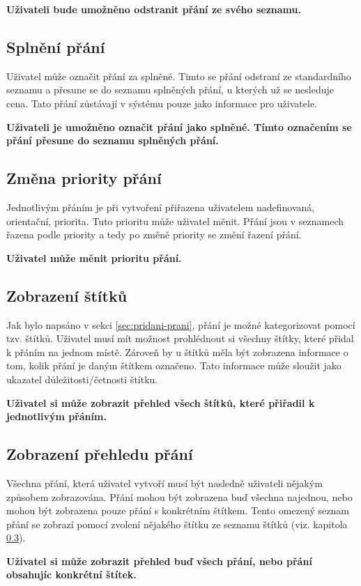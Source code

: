 \textbf{Uživateli bude umožněno odstranit přání ze svého seznamu.}

\subsection{Splnění přání}
Uživatel může označit přání za splněné. Timto se přání odstraní ze standardního seznamu a přesune se do seznamu splněných přání, u kterých už se nesleduje cena. Tato přání zůstávají v sýstému pouze jako informace pro uživatele.

\textbf{Uživateli je umožněno označit přání jako splněné. Tímto označením se přání přesune do seznamu splněných přání.}

\subsection{Změna priority přání}
Jednotlivým přáním je při vytvoření přiřazena uživatelem nadefinovaná, orientační, priorita. Tuto prioritu může uživatel měnit. Přání jsou v seznamech řazena podle priority a tedy po změně priority se změní řazení přání.

\textbf{Uživatel může měnit prioritu přání.}

\subsection{Zobrazení štítků}
\label{sec:zobrazeni-stitku}
Jak bylo napsáno v sekci \ref{sec:pridani-prani}, přání je možné kategorizovat pomocí tzv. štítků. Uživatel musí mít možnost prohlédnout si všechny štítky, které přidal k přáním na jednom místě. Zároveň by u štítků měla být zobrazena informace o tom, kolik přání je daným štítkem označeno. Tato informace může sloužit jako ukazatel důležitosti/četnosti štítku.

\textbf{Uživatel si může zobrazit přehled všech štítků, které přiřadil k jednotlivým přáním.}

\subsection{Zobrazení přehledu přání}
Všechna přání, která uživatel vytvoří musí být nasledně uživateli nějakým způsobem zobrazována. Přání mohou být zobrazena buď všechna najednou, nebo mohou být zobrazena pouze přání s konkrétním štítkem. Tento omezený seznam přání se zobrazí pomocí zvolení nějakého štítku ze seznamu štítků (viz. kapitola \ref{sec:zobrazeni-stitku}).

\textbf{Uživatel si může zobrazit přehled buď všech přání, nebo přání obsahujíc konkrétní štítek.}

